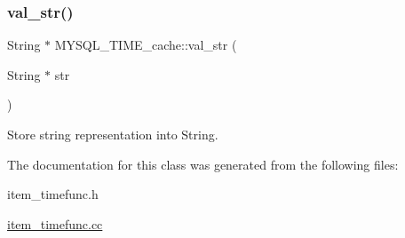 \subsubsection{\texorpdfstring{val\+\_\+str()}{val\_str()}}
{\footnotesize\ttfamily String $\ast$ M\+Y\+S\+Q\+L\+\_\+\+T\+I\+M\+E\+\_\+cache\+::val\+\_\+str (\begin{DoxyParamCaption}\item[{String $\ast$}]{str }\end{DoxyParamCaption})}

Store string representation into String. 

The documentation for this class was generated from the following files\+:\begin{DoxyCompactItemize}
\item 
item\+\_\+timefunc.\+h\item 
\mbox{\hyperlink{item__timefunc_8cc}{item\+\_\+timefunc.\+cc}}\end{DoxyCompactItemize}
